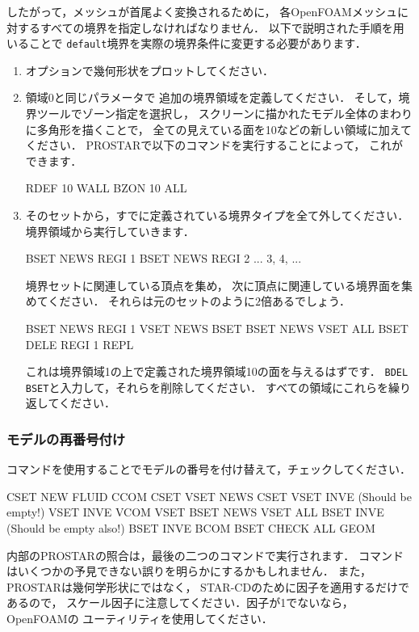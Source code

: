 したがって，メッシュが首尾よく変換されるために，
各OpenFOAMメッシュに対するすべての境界を指定しなければなりません．
以下で説明された手順を用いることで
\texttt{default}境界を実際の境界条件に変更する必要があります．
\begin{enumerate}
 \item {}オプションで幾何形状をプロットしてください．
 \item {}領域0と同じパラメータで
       追加の境界領域を定義してください．
       そして，境界ツールでゾーン指定を選択し，
       スクリーンに描かれたモデル全体のまわりに多角形を描くことで，
       全ての見えている面を10などの新しい領域に加えてください．
       \textsf{PROSTAR}で以下のコマンドを実行することによって，
       これができます．
\begin{OFverbatim}[terminal]
RDEF 10 WALL
BZON 10 ALL
\end{OFverbatim}
 \item そのセットから，すでに定義されている境界タイプを全て外してください．
       境界領域から実行していきます．
\begin{OFverbatim}[terminal]
BSET NEWS REGI 1
BSET NEWS REGI 2
... 3, 4, ...
\end{OFverbatim}
       境界セットに関連している頂点を集め，
       次に頂点に関連している境界面を集めてください．
       それらは元のセットのように$2$倍あるでしょう．
\begin{OFverbatim}[terminal]
BSET NEWS REGI 1
VSET NEWS BSET
BSET NEWS VSET ALL
BSET DELE REGI 1
REPL
\end{OFverbatim}
       これは境界領域1の上で定義された境界領域10の面を与えるはずです．
       \verb|BDEL BSET|と入力して，それらを削除してください．
       すべての領域にこれらを繰り返してください．
\end{enumerate}

\subsubsection{モデルの再番号付け}
\label{sssec:5.5.2.4}
コマンドを使用することでモデルの番号を付け替えて，チェックしてください．
\begin{OFverbatim}[terminal]
CSET NEW FLUID
CCOM CSET
VSET NEWS CSET
VSET INVE (Should be empty!)
VSET INVE
VCOM VSET
BSET NEWS VSET ALL
BSET INVE (Should be empty also!)
BSET INVE
BCOM BSET
CHECK ALL
GEOM
\end{OFverbatim}
内部の\textsf{PROSTAR}の照合は，最後の二つのコマンドで実行されます．
コマンドはいくつかの予見できない誤りを明らかにするかもしれません．
また，\textsf{PROSTAR}は幾何学形状にではなく，
STAR-CDのために因子を適用するだけであるので，
スケール因子に注意してください．因子が1でないなら，
OpenFOAMの
%
%
ユーティリティを使用してください．

